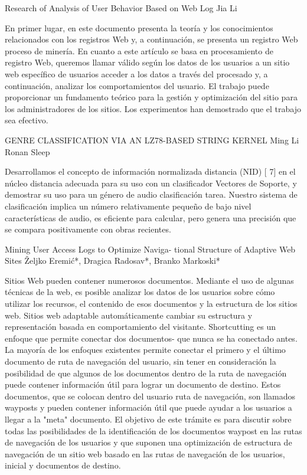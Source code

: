 Research of Analysis of User Behavior Based on Web Log
Jia Li

En primer lugar, en este documento presenta la teoría y los conocimientos relacionados con los registros Web y, a continuación, se presenta un registro Web proceso de minería. En cuanto a este artículo se basa en procesamiento de registro Web, queremos llamar válido según los datos de los usuarios a un sitio web específico de usuarios acceder a los datos a través del procesado y, a continuación, analizar los comportamientos del usuario. El trabajo puede proporcionar un fundamento teórico para la gestión y optimización del sitio para los administradores de los sitios. Los experimentos han demostrado que el trabajo sea efectivo.


GENRE CLASSIFICATION VIA AN LZ78-BASED STRING KERNEL
Ming Li
Ronan Sleep

Desarrollamos el concepto de información normalizada distancia (NID) [ 7] en el núcleo distancia adecuada para su uso con un clasificador Vectores de Soporte, y demostrar su uso para un género de audio clasificación tarea. Nuestro sistema de clasificación implica un número relativamente pequeño de bajo nivel características de audio, es eficiente para calcular, pero genera una precisión que se compara positivamente con obras recientes.


Mining User Access Logs to Optimize Naviga- tional Structure of Adaptive Web Sites
Željko Eremić*, Dragica Radosav*, Branko Markoski*

Sitios Web pueden contener numerosos documentos. Mediante el uso de algunas técnicas de la web, es posible analizar los datos de los usuarios sobre cómo utilizar los recursos, el contenido de esos documentos y la estructura de los sitios web. Sitios web adaptable automáticamente cambiar su estructura y representación basada en comportamiento del visitante. Shortcutting es un enfoque que permite conectar dos documentos- que nunca se ha conectado antes. La mayoría de los enfoques existentes permite conectar el primero y el último documento de ruta de navegación del usuario, sin tener en consideración la posibilidad de que algunos de los documentos dentro de la ruta de navegación puede contener información útil para lograr un documento de destino. Estos documentos, que se colocan dentro del usuario ruta de navegación, son llamados wayposts y pueden contener información útil que puede ayudar a los usuarios a llegar a la "meta" documento. El objetivo de este trámite es para discutir sobre todas las posibilidades de la identificación de los documentos waypost en las rutas de navegación de los usuarios y que suponen una optimización de estructura de navegación de un sitio web basado en las rutas de navegación de los usuarios, inicial y documentos de destino.



